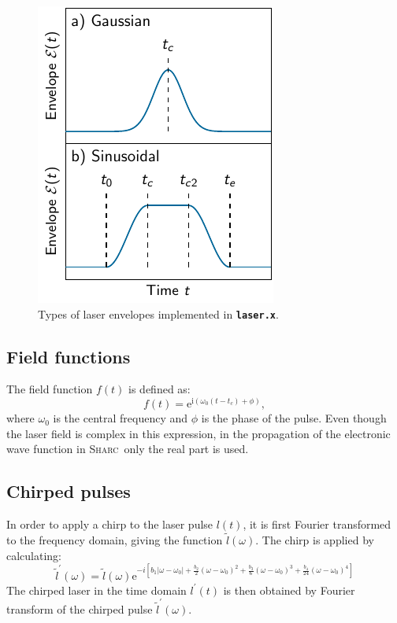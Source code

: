 \documentclass[a4paper,10pt,DIV=15,openany]{scrbook}
\newcommand{\sharc}{\textsc{Sharc}}
\newcommand{\ttt}[1]{\textbf{\texttt{#1}}}
\newcommand{\E}{\ensuremath{\mathrm{e}}}
\newcommand{\I}{\ensuremath{\mathrm{i}}}
\begin{document}
\begin{figure}[htb]
  \centering
  \includegraphics[scale=1]{img/laser_envelope/laser_envelope.pdf}
  \caption{Types of laser envelopes implemented in \ttt{laser.x}.}
  \label{fig:laser_envelope}
\end{figure}

\subsection{Field functions}

The field function $f(t)$ is defined as:
\begin{equation}
  f(t)=\E^{\I \left(\omega_0(t-t_c)+\phi\right)},
\end{equation}
where $\omega_0$ is the central frequency and $\phi$ is the phase of the pulse. Even though the laser field is complex in this expression, in the propagation of the electronic wave function in \sharc\ only the real part is used.

\subsection{Chirped pulses}

In order to apply a chirp to the laser pulse $l(t)$, it is first Fourier transformed to the frequency domain, giving the function $\tilde{l}(\omega)$. The chirp is applied by calculating:
\begin{equation}
  \tilde{l}^\prime(\omega)=
  \tilde{l}(\omega)
  \E^{-i\left[
  b_1|\omega-\omega_0|
  +\frac{b_2}{2}(\omega-\omega_0)^2
  +\frac{b_3}{6}(\omega-\omega_0)^3
  +\frac{b_4}{24}(\omega-\omega_0)^4
  \right]}\label{eq:laser_chirp}
\end{equation}
The chirped laser in the time domain $l^\prime(t)$ is then obtained by Fourier transform of the chirped pulse $\tilde{l}^\prime(\omega)$.
\end{document}
